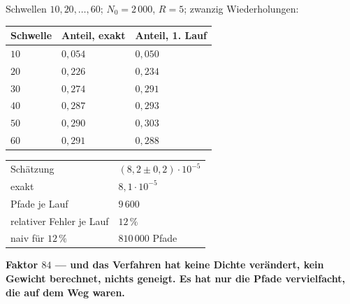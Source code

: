 \begin{merksatz}
Schwellen $10, 20, \ldots, 60$; $N_0 = 2\,000$, $R = 5$; zwanzig Wiederholungen:

\begin{center}
{\small
\renewcommand{\arraystretch}{1.48}
\begin{tabular}{@{}P{1.6cm}P{2.4cm}P{2.4cm}@{}}
\toprule
\textbf{Schwelle} & \textbf{Anteil, exakt} & \textbf{Anteil, 1. Lauf}\\
\midrule
$10$ & $0{,}054$ & $0{,}050$\\
$20$ & $0{,}226$ & $0{,}234$\\
$30$ & $0{,}274$ & $0{,}291$\\
$40$ & $0{,}287$ & $0{,}293$\\
$50$ & $0{,}290$ & $0{,}303$\\
$60$ & $0{,}291$ & $0{,}288$\\
\bottomrule
\end{tabular}}
\end{center}

\begin{center}
{\small
\renewcommand{\arraystretch}{1.48}
\begin{tabular}{@{}P{4.2cm}P{3.6cm}@{}}
\toprule
Schätzung & $(8{,}2\pm0{,}2)\cdot10^{-5}$\\
exakt & $8{,}1\cdot10^{-5}$\\
Pfade je Lauf & $9\,600$\\
relativer Fehler je Lauf & $12\,\%$\\
naiv für $12\,\%$ & $810\,000$ Pfade\\
\bottomrule
\end{tabular}}
\end{center}

\begin{center}
\begin{minipage}{0.9\textwidth}
\textbf{Faktor $84$ --- und das Verfahren hat keine Dichte verändert, kein Gewicht berechnet, nichts geneigt. Es hat nur die Pfade vervielfacht, die auf dem Weg waren.}
\end{minipage}
\end{center}

\begin{center}
\begin{minipage}{0.88\textwidth}
\end{minipage}
\end{center}
\end{merksatz}

